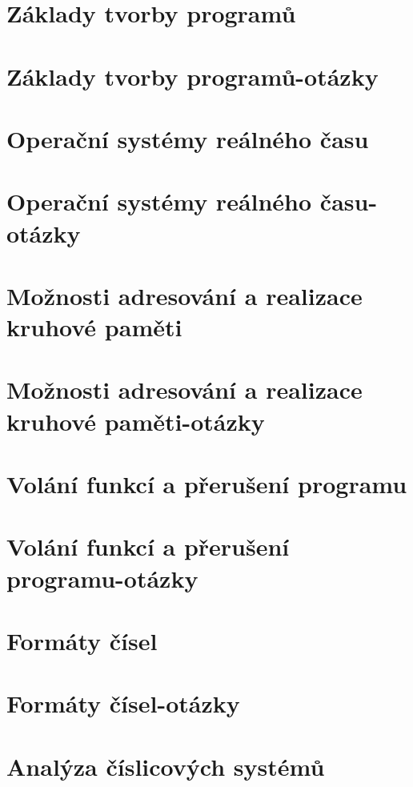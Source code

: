 \documentclass[10pt, a4paper]{article}%
\begin{document}
\tableofcontents

\section{Základy tvorby programů}

\section{Základy tvorby programů-otázky}

\section{Operační systémy reálného času}

\section{Operační systémy reálného času-otázky}

\section{Možnosti adresování a realizace kruhové paměti}

\section{Možnosti adresování a realizace kruhové paměti-otázky}

\section{Volání funkcí a přerušení programu}

\section{Volání funkcí a přerušení programu-otázky}

\section{Formáty čísel}

\section{Formáty čísel-otázky}

\section{Analýza číslicových systémů}

\end{document}
